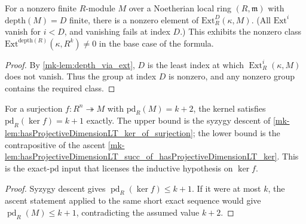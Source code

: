 \begin{lemma}\label{mk-lem:exists_ne_zero_ext_of_depth_eq}
  \leanok

  For a nonzero finite \(R\)-module \(M\) over a Noetherian local ring \((R, \mathfrak m)\)
  with \(\text{depth}(M) = D\) finite, there is a nonzero element of
  \(\text{Ext}^D_R(\kappa, M)\). (All \(\text{Ext}^i\) vanish for \(i < D\), and
  vanishing fails at index \(D\).) This exhibits the nonzero class
  \(\text{Ext}^{\text{depth}(R)}(\kappa, R^k) \neq 0\) in the base case of the formula.
\end{lemma}
\begin{proof}
  \leanok

By \ref{mk-lem:depth_via_ext}, \(D\) is the least index at which
  \(\operatorname{Ext}^i_R(\kappa,M)\) does not vanish. Thus the group at
  index \(D\) is nonzero, and any nonzero group contains the required class.
\end{proof}

\begin{lemma}\label{mk-lem:projectiveDimension_ker_eq_of_surjection}
  \leanok

  For a surjection \(f : R^n \twoheadrightarrow M\) with \(\text{pd}_R(M) = k + 2\), the
  kernel satisfies \(\text{pd}_R(\ker f) = k + 1\) exactly. The upper bound is the
  syzygy descent of \ref{mk-lem:hasProjectiveDimensionLT_ker_of_surjection}; the lower
  bound is the contrapositive of the ascent
  \ref{mk-lem:hasProjectiveDimensionLT_succ_of_hasProjectiveDimensionLT_ker}. This is
  the exact-\(\text{pd}\) input that licenses the inductive hypothesis on \(\ker f\).
\end{lemma}
\begin{proof}
  \leanok

Syzygy descent gives \(\operatorname{pd}_R(\ker f)\leq k+1\).
  If it were at most \(k\), the ascent statement applied to the same short
  exact sequence would give \(\operatorname{pd}_R(M)\leq k+1\), contradicting
  the assumed value \(k+2\).
\end{proof}


